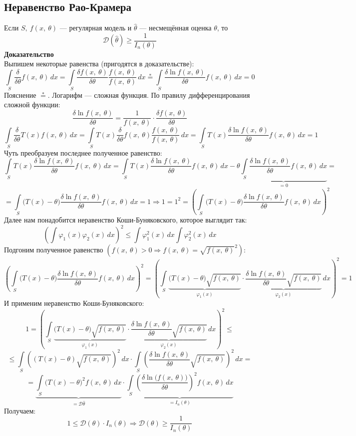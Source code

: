 \documentclass[12pt, a4paper]{article}
\newcommand{\dev}{\mathcal{D}}
\begin{document}
\subsection*{Неравенство Рао-Крамера}
Если $S,\ f(x,\ \theta)$ --- регулярная модель и $\hat{\theta}$ --- несмещённая оценка $\theta$, то 
\[\dev (\hat{\theta}) \geq \frac{1}{I_n(\theta)}\]
\textbf{Доказательство}\\
Выпишем некоторые равенства (пригодятся в доказательстве):
\[\int\limits_S \frac{\delta}{\delta \theta} f(x,\ \theta)\, dx = \int\limits_S \frac{\delta f(x,\ \theta)}{\delta \theta} \frac{f(x,\ \theta)}{f(x,\ \theta)}\, dx \overset{*}{=} \int\limits_S \frac{\delta \ln f(x,\ \theta)}{\delta \theta} f(x,\ \theta)\, dx = 0\]
Пояснение $\overset{*}{=}$. Логарифм --- сложная функция. По правилу дифференцирования сложной функции:
\[\frac{\delta \ln f(x,\ \theta)}{\delta \theta} = \frac{1}{f(x,\ \theta)} \cdot \frac{\delta f(x,\ \theta)}{\delta \theta}\]
\[\int\limits_S \frac{\delta}{\delta \theta} T(x) f(x,\ \theta)\, dx = \int\limits_S T(x) \frac{\delta}{\delta \theta} f(x,\ \theta) \frac{f(x,\ \theta)}{f(x,\ \theta)}\, dx = \int\limits_S T(x) \frac{\delta \ln f(x,\ \theta)}{\delta \theta} f(x,\ \theta)\, dx = 1\]
Чуть преобразуем последнее полученное равенство:
\[\int\limits_S T(x) \frac{\delta \ln f(x,\ \theta)}{\delta \theta} f(x,\ \theta)\, dx = \int\limits_S T(x) \frac{\delta \ln f(x,\ \theta)}{\delta \theta} f(x,\ \theta)\, dx - \theta\underset{=0}{\underbrace{\int\limits_S \frac{\delta \ln f(x,\ \theta)}{\delta \theta} f(x,\ \theta)\, dx}} = \]
\[= \int\limits_S \big( T(x) - \theta \big) \frac{\delta \ln f(x,\ \theta)}{\delta \theta} f(x,\ \theta)\, dx = 1 \Rightarrow 1 = 1^2 = {\left( \int\limits_S \big( T(x) - \theta \big) \frac{\delta \ln f(x,\ \theta)}{\delta \theta} f(x,\ \theta)\, dx \right)}^2 \]
Далее нам понадобится неравенство Коши-Буняковского, которое выглядит так:
\[{\left( \int \varphi_1(x)\varphi_2(x)\, dx \right)}^2 \leq \int \varphi_1^2(x)\, dx\int \varphi_2^2(x)\, dx\]
Подгоним полученное равенство $\left(f(x,\ \theta) > 0 \Rightarrow f(x,\ \theta) = \sqrt{f(x,\ \theta)}^2\right)$:
\[{\left( \int\limits_S \big( T(x) - \theta \big) \frac{\delta \ln f(x,\ \theta)}{\delta \theta} f(x,\ \theta)\, dx \right)}^2 = {\left( \int\limits_S \underset{\varphi_1(x)}{\underbrace{\big( T(x) - \theta \big) \sqrt{f(x,\ \theta)}}}\cdot\underset{\varphi_2(x)}{\underbrace{\frac{\delta \ln f(x,\ \theta)}{\delta \theta} \sqrt{f(x,\ \theta)}}}\, dx \right)}^2 = 1\]
И применим неравенство Коши-Буняковского:
\[1 = {\left( \int\limits_S \underset{\varphi_1(x)}{\underbrace{\big( T(x) - \theta \big) \sqrt{f(x,\ \theta)}}}\cdot\underset{\varphi_2(x)}{\underbrace{\frac{\delta \ln f(x,\ \theta)}{\delta \theta} \sqrt{f(x,\ \theta)}}}\, dx \right)}^2 \leq\]
\[\leq \int\limits_S {\left( (T(x) - \theta)\sqrt{f(x,\ \theta)} \right)}^2 \, dx \cdot \int\limits_S {\left( \frac{\delta \ln f(x,\ \theta)}{\delta \theta} \sqrt{f(x,\ \theta)} \right)}^2 \, dx =\]
\[= \underset{=\dev\hat{\theta}}{\underbrace{\int\limits_S {\big( T(x) - \theta \big)}^2 f(x,\ \theta)\, dx}} \cdot \underset{=I_n(\theta)}{\underbrace{\int\limits_S{\left( \frac{\delta \ln \big(f(x,\ \theta)\big)}{\delta \theta} \right)}^2 f(x,\ \theta)\, dx}}\]
Получаем:
\[1 \leq \dev (\theta) \cdot I_n(\theta)\Rightarrow \dev (\theta) \geq \frac{1}{I_n(\theta)}\]
\end{document}
